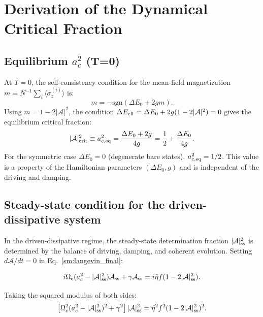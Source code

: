\documentclass[aps,prd,onecolumn]{revtex4-2}
\begin{document}
\section{Derivation of the Dynamical Critical Fraction}

\subsection{Equilibrium $a_c^2$ (T=0)}

At $T=0$, the self-consistency condition for the mean-field magnetization $m = N^{-1}\sum_i\langle\sigma_z^{(i)}\rangle$ is:
\begin{equation}
m = -\mathrm{sgn}(\Delta E_0 + 2gm).
\label{sm:mf_condition}
\end{equation}
Using $m = 1 - 2|\mathcal{A}|^2$, the condition $\Delta E_{\rm eff} = \Delta E_0 + 2g(1-2|\mathcal{A}|^2) = 0$ gives the equilibrium critical fraction:
\begin{equation}
|\mathcal{A}|^2_{\rm crit} \equiv a_{c,\rm eq}^2 = \frac{\Delta E_0 + 2g}{4g} = \frac{1}{2} + \frac{\Delta E_0}{4g}.
\label{sm:ac2_eq}
\end{equation}
For the symmetric case $\Delta E_0 = 0$ (degenerate bare states), $a_{c,\rm eq}^2 = 1/2$. This value is a property of the Hamiltonian parameters $(\Delta E_0, g)$ and is independent of the driving and damping.

\subsection{Steady-state condition for the driven-dissipative system}

In the driven-dissipative regime, the steady-state determination fraction $|\mathcal{A}|^2_{\rm ss}$ is determined by the balance of driving, damping, and coherent evolution. Setting $d\mathcal{A}/dt = 0$ in Eq.~\eqref{sm:langevin_final}:

\begin{equation}
i\Omega_c(a_c^2 - |\mathcal{A}|^2_{\rm ss})\mathcal{A}_{\rm ss} + \gamma\mathcal{A}_{\rm ss} = i\tilde{\eta}f(1-2|\mathcal{A}|^2_{\rm ss}).
\label{sm:steady_complex}
\end{equation}

Taking the squared modulus of both sides:
\begin{equation}
\left[\Omega_c^2(a_c^2 - |\mathcal{A}|^2_{\rm ss})^2 + \gamma^2\right]|\mathcal{A}|^2_{\rm ss} = \tilde{\eta}^2 f^2 (1-2|\mathcal{A}|^2_{\rm ss})^2.
\label{sm:steady_cubic}
\end{equation}
\end{document}
